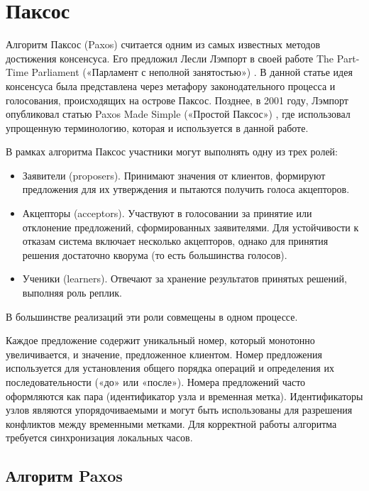 \section{Паксос}

Алгоритм Паксос (Paxos) считается одним из самых известных методов достижения
консенсуса. Его предложил Лесли Лэмпорт в своей работе The Part-Time
Parliament («Парламент с неполной занятостью») \cite{lamport98}. В данной
статье идея консенсуса была представлена через метафору законодательного
процесса и голосования, происходящих на острове Паксос. Позднее, в 2001 году,
Лэмпорт опубликовал статью Paxos Made Simple («Простой Паксос») \cite{lamport01},
где использовал упрощенную терминологию, которая и используется в данной работе.

В рамках алгоритма Паксос участники могут выполнять одну из трех ролей:

\begin{itemize}
    \item Заявители (proposers). Принимают значения от клиентов, формируют
        предложения для их утверждения и пытаются получить голоса акцепторов.
    \item Акцепторы (acceptors). Участвуют в голосовании за принятие или
        отклонение предложений, сформированных заявителями. Для устойчивости
        к отказам система включает несколько акцепторов, однако для принятия
        решения достаточно кворума (то есть большинства голосов).
    \item Ученики (learners). Отвечают за хранение результатов принятых решений,
        выполняя роль реплик.
\end{itemize}

В большинстве реализаций эти роли совмещены в одном процессе.

Каждое предложение содержит уникальный номер, который монотонно увеличивается,
и значение, предложенное клиентом. Номер предложения используется для установления
общего порядка операций и определения их последовательности («до» или «после»).
Номера предложений часто оформляются как пара (идентификатор узла и временная метка).
Идентификаторы узлов являются упорядочиваемыми и могут быть использованы для
разрешения конфликтов между временными метками. Для корректной работы алгоритма
требуется синхронизация локальных часов.

\subsection{Алгоритм Paxos}

